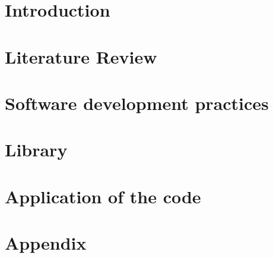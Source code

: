 \documentclass[12pt]{book}
\begin{document}
\newpage
{}
\maketitle

\chapter{Introduction}


\chapter{Literature Review}


\chapter{Software development practices}


\chapter{Library}


\chapter{Application of the code}


\appendix
\chapter{Appendix}


\newpage


\end{document}
